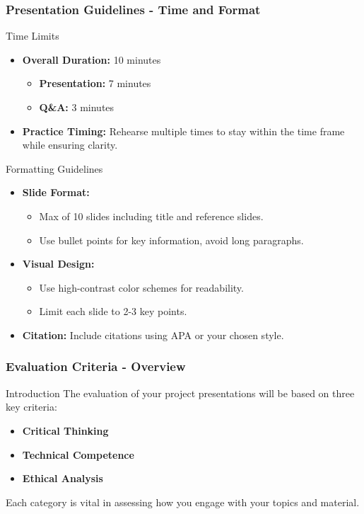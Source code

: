 \documentclass[aspectratio=169]{beamer}
\begin{document}
\begin{frame}[fragile]
    \frametitle{Presentation Guidelines - Time and Format}
    \begin{block}{Time Limits}
        \begin{itemize}
            \item \textbf{Overall Duration:} 10 minutes
                \begin{itemize}
                    \item \textbf{Presentation:} 7 minutes
                    \item \textbf{Q\&A:} 3 minutes
                \end{itemize}
            \item \textbf{Practice Timing:} Rehearse multiple times to stay within the time frame while ensuring clarity.
        \end{itemize}
    \end{block}

    \begin{block}{Formatting Guidelines}
        \begin{itemize}
            \item \textbf{Slide Format:}
                \begin{itemize}
                    \item Max of 10 slides including title and reference slides.
                    \item Use bullet points for key information, avoid long paragraphs.
                \end{itemize}
            \item \textbf{Visual Design:}
                \begin{itemize}
                    \item Use high-contrast color schemes for readability.
                    \item Limit each slide to 2-3 key points.
                \end{itemize}
            \item \textbf{Citation:} Include citations using APA or your chosen style.
        \end{itemize}
    \end{block}
\end{frame}

\begin{frame}[fragile]
    \frametitle{Evaluation Criteria - Overview}
    \begin{block}{Introduction}
        The evaluation of your project presentations will be based on three key criteria:
        \begin{itemize}
            \item \textbf{Critical Thinking}
            \item \textbf{Technical Competence}
            \item \textbf{Ethical Analysis}
        \end{itemize}
        Each category is vital in assessing how you engage with your topics and material.
    \end{block}
\end{frame}
\end{document}
